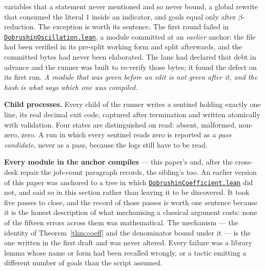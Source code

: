 \documentclass[11pt]{article}
\theoremstyle{definition}
\newcommand{\anchor}{c7b870b05bd6d1bec270d499e1358a64070ce0e1}
\newcommand{\repofile}[2]{%
  \href{https://github.com/lluiseriksson/THE-ERIKSSON-PROGRAMME/blob/\anchor/#1}{\nolinkurl{#2}}}
\begin{document}
variables that a statement never mentioned and so never bound, a global
rewrite that consumed the literal $1$ inside an indicator, and goals equal only
after $\beta$-reduction.  The exception is worth its sentence.  The first
round failed in
\repofile{YangMills/OS/DobrushinOscillation.lean}{DobrushinOscillation.lean},
a module committed at an \emph{earlier} anchor: the file had been verified in
its pre-split working form and split afterwards, and the committed bytes had
never been elaborated.  The lane had declared that debt in advance and the
runner was built to re-verify those bytes; it found the defect on its first
run.  \emph{A module that was green before an edit is not green after it, and
the hash is what says which one was compiled.}

\textbf{Child processes.}  Every child of the runner writes a sentinel holding
exactly one line, its real decimal exit code, captured after termination and
written atomically with validation.  Four states are distinguished on read:
absent, malformed, non-zero, zero.  A run in which every sentinel reads zero is
reported as a \emph{pass candidate}, never as a pass, because the logs still
have to be read.

\textbf{Every module in the anchor compiles} --- this paper's and, after the
cross-desk repair the job-count paragraph records, the sibling's too.  An
earlier version of this paper
was anchored to a tree in which
\repofile{YangMills/OS/DobrushinCoefficient.lean}{DobrushinCoefficient.lean} did
not, and said so in this section rather than leaving it to be discovered.  It
took five passes to close, and the record of those passes is worth one sentence
because it is the honest description of what mechanising a classical argument
costs: none of the fifteen errors across them was mathematical.  The mechanism
--- the identity of Theorem~\ref{thm:coeff} and the denominator bound under it
--- is the one written in the first draft and was never altered.  Every failure
was a library lemma whose name or form had been recalled wrongly, or a tactic
emitting a different number of goals than the script assumed.
\end{document}

